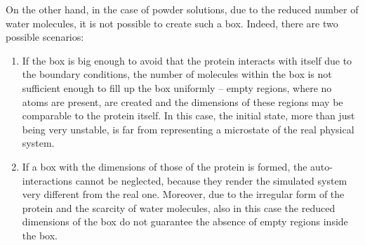 On the other hand, in the case of powder solutions, due to the reduced number of water molecules, it is not possible to create such a box. Indeed, there are two possible scenarios:
\begin{enumerate}
\item If the box is big enough to avoid that the protein interacts with itself due to the boundary conditions, the number of molecules within the box is not sufficient enough to fill up the box uniformly – empty regions, where no atoms are present, are created and the dimensions of these regions may be comparable to the protein itself. In this case, the initial state, more than just being very unstable, is far from representing a microstate of the real physical system.
\item If a box with the dimensions of those of the protein is formed, the auto-interactions cannot be neglected, because they render the simulated system very different from the real one. Moreover, due to the irregular form of the protein and the scarcity of water molecules, also in this case the reduced dimensions of the box do not guarantee the absence of empty regions inside the box.
\end{enumerate}

